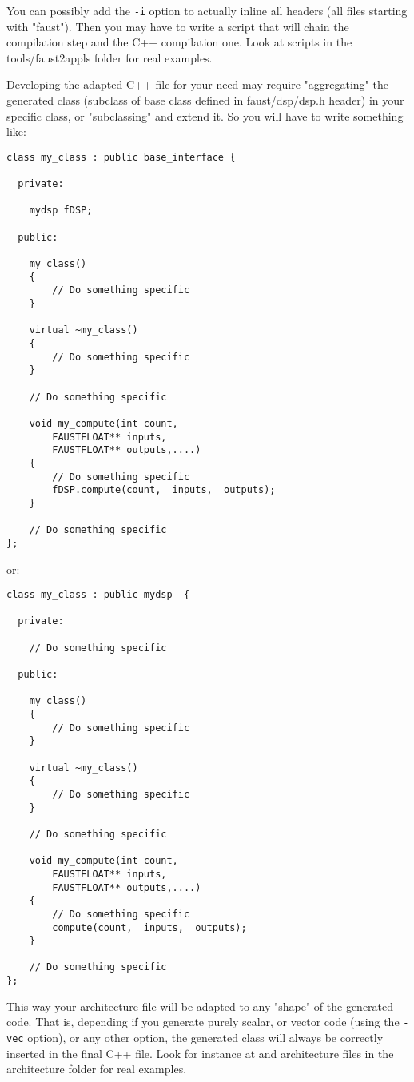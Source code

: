 You can possibly add the \lstinline'-i' option to actually inline all  headers (all files starting with "faust"). Then you may have to write a  script that will chain the \faust compilation step and the C++ compilation one. Look at scripts in the tools/faust2appls folder for real examples. 

Developing the adapted C++ file for your need may require "aggregating" the generated  class (subclass of  base class defined in faust/dsp/dsp.h header) in your specific class, or "subclassing" and extend it.  So you will have to write something like:

\begin{lstlisting}[basicstyle=\ttfamily\footnotesize\color{yotxt}]
class my_class : public base_interface {

  private:
	 
	mydsp fDSP;
		
  public:
  
	my_class()
	{
		// Do something specific
	}
	
	virtual ~my_class()
	{
		// Do something specific
	}
	
	// Do something specific
	
	void my_compute(int count, 
		FAUSTFLOAT** inputs, 
		FAUSTFLOAT** outputs,....)
	{
		// Do something specific
		fDSP.compute(count,  inputs,  outputs);
	}
	
	// Do something specific
};

\end{lstlisting} 

or:

\begin{lstlisting}[basicstyle=\ttfamily\footnotesize\color{yotxt}]
class my_class : public mydsp  {

  private:
  
  	// Do something specific
		
  public:
  
	my_class()
	{
		// Do something specific
	}
	
	virtual ~my_class()
	{
		// Do something specific
	}
	
	// Do something specific
	
	void my_compute(int count, 
		FAUSTFLOAT** inputs, 
		FAUSTFLOAT** outputs,....)
	{
		// Do something specific
		compute(count,  inputs,  outputs);
	}
	
	// Do something specific
};
\end{lstlisting} 

This way your architecture file will be adapted to any "shape" of the generated code. That is, depending if you generate purely scalar, or vector code (using the \lstinline'-vec' option), or any other option, the generated   class will always be correctly inserted in the final C++ file. Look for instance at  and  architecture files in the architecture folder for real examples. 

